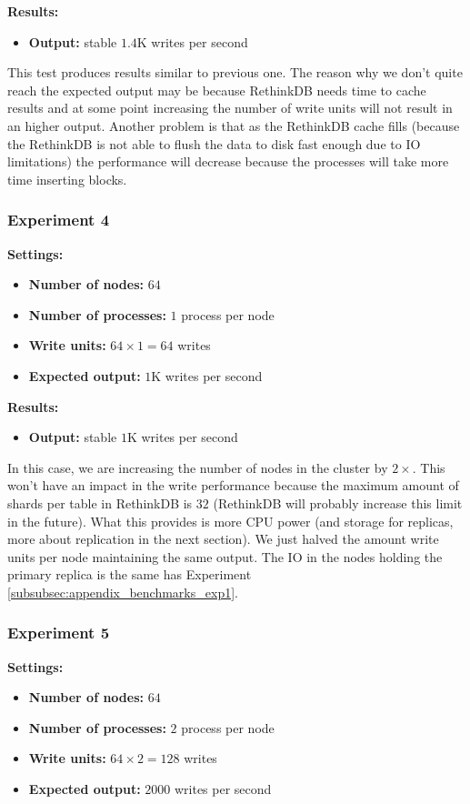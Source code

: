 \medskip
\noindent\textbf{Results:}
\begin{itemize}
 \item \textbf{Output:} stable $1.4$K writes per second
\end{itemize}

This test produces results similar to previous one. 
The reason why we don't quite reach the expected output may be because RethinkDB needs time to cache results and at some point increasing the number of write units will not result in an higher output. 
Another problem is that as the RethinkDB cache fills (because the RethinkDB is not able to flush the data to disk fast enough due to IO limitations) the performance will decrease because the processes will take more time inserting blocks. 

\subsubsection{Experiment 4}\label{subsubsec:appendix_benchmarks_exp4}
\medskip
\noindent\textbf{Settings:}
\begin{itemize}
 \item \textbf{Number of nodes:} $64$
 \item \textbf{Number of processes:} $1$ process per node
 \item \textbf{Write units:} $64 \times 1 = 64$ writes
 \item \textbf{Expected output:} $1$K writes per second
\end{itemize}

\medskip
\noindent\textbf{Results:}
\begin{itemize}
 \item \textbf{Output:} stable $1$K writes per second
\end{itemize}

In this case, we are increasing the number of nodes in the cluster by $2\times$. 
This won't have an impact in the write performance because the maximum amount of shards per table in RethinkDB is $32$ (RethinkDB will probably increase this limit in the future).
What this provides is more CPU power (and storage for replicas, more about replication in the next section). 
We just halved the amount write units per node maintaining the same output. 
The IO in the nodes holding the primary replica is the same has Experiment \ref{subsubsec:appendix_benchmarks_exp1}. 

\subsubsection{Experiment 5}\label{subsubsec:appendix_benchmarks_exp5}
\medskip
\noindent\textbf{Settings:}
\begin{itemize}
 \item \textbf{Number of nodes:} $64$
 \item \textbf{Number of processes:} $2$ process per node
 \item \textbf{Write units:} $64 \times 2 = 128$ writes
 \item \textbf{Expected output:} $2000$ writes per second
\end{itemize}

